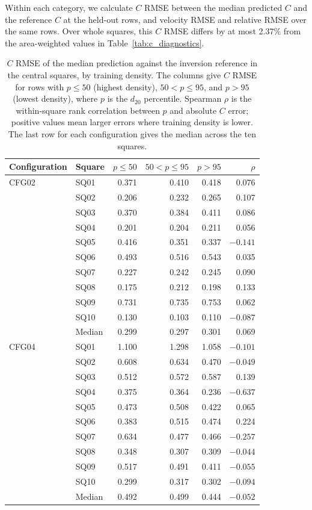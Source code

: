\documentclass[review,jog]{igs}
\providecommand{\toprule}{\hline}
\providecommand{\midrule}{\hline}
\providecommand{\bottomrule}{\hline}
\begin{document}
Within each category, we calculate $C$ RMSE between the median predicted $C$ and the reference $C$ at the held-out rows, and velocity RMSE and relative RMSE over the same rows. Over whole squares, this $C$ RMSE differs by at most 2.37\% from the area-weighted values in Table~\ref{tab:c_diagnostics}.

\begin{table}
\centering\small
\caption{$C$ RMSE of the median prediction against the inversion reference in the central squares, by training density. The columns give $C$ RMSE for rows with $p\leq50$ (highest density), $50<p\leq95$, and $p>95$ (lowest density), where $p$ is the $d_{20}$ percentile. Spearman $\rho$ is the within-square rank correlation between $p$ and absolute $C$ error; positive values mean larger errors where training density is lower. The last row for each configuration gives the median across the ten squares.}
\label{tab:representation_c}
\begin{tabular}{llrrrr}
\toprule
Configuration & Square & $p\leq50$ & $50<p\leq95$ & $p>95$ & $\rho$\\
\midrule
CFG02 & SQ01 & 0.371 & 0.410 & 0.418 & 0.076\\
 & SQ02 & 0.206 & 0.232 & 0.265 & 0.107\\
 & SQ03 & 0.370 & 0.384 & 0.411 & 0.086\\
 & SQ04 & 0.201 & 0.204 & 0.211 & 0.056\\
 & SQ05 & 0.416 & 0.351 & 0.337 & $-0.141$\\
 & SQ06 & 0.493 & 0.516 & 0.543 & 0.035\\
 & SQ07 & 0.227 & 0.242 & 0.245 & 0.090\\
 & SQ08 & 0.175 & 0.212 & 0.198 & 0.133\\
 & SQ09 & 0.731 & 0.735 & 0.753 & 0.062\\
 & SQ10 & 0.130 & 0.103 & 0.110 & $-0.087$\\
 & Median & 0.299 & 0.297 & 0.301 & 0.069\\
\midrule
CFG04 & SQ01 & 1.100 & 1.298 & 1.058 & $-0.101$\\
 & SQ02 & 0.608 & 0.634 & 0.470 & $-0.049$\\
 & SQ03 & 0.512 & 0.572 & 0.587 & 0.139\\
 & SQ04 & 0.375 & 0.364 & 0.236 & $-0.637$\\
 & SQ05 & 0.473 & 0.508 & 0.422 & 0.065\\
 & SQ06 & 0.383 & 0.515 & 0.474 & 0.224\\
 & SQ07 & 0.634 & 0.477 & 0.466 & $-0.257$\\
 & SQ08 & 0.348 & 0.307 & 0.309 & $-0.044$\\
 & SQ09 & 0.517 & 0.491 & 0.411 & $-0.055$\\
 & SQ10 & 0.299 & 0.317 & 0.302 & $-0.094$\\
 & Median & 0.492 & 0.499 & 0.444 & $-0.052$\\
\bottomrule
\end{tabular}
\end{table}
\end{document}

